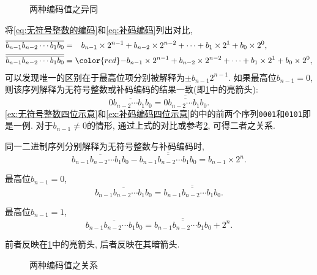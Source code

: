 \documentclass{ctexart}
\def\binaryseq#1{{\texttt{#1}}}
\begin{document}
\begin{figure}[ht]
    \centering
    \caption{两种编码值之异同}
    \label{fig:两种编码值之异同}
\end{figure}
将\eqref{eq:无符号整数的编码}和\eqref{eq:补码编码}列出对比,
\begin{align*}
    {\overline{b_{n-1}b_{n-2}\cdots b_1b_0}} &= \phantom{-}b_{n-1} \times 2^{n-1} + b_{n-2} \times 2^{n-2} + \cdots + b_1 \times 2^1 + b_0 \times 2^0, \\
    \overline{\overline{b_{n-1}b_{n-2}\cdots b_1b_0}} &= {\color{red}-}b_{n-1} \times 2^{n-1} + b_{n-2} \times 2^{n-2} + \cdots + b_1 \times 2^1 + b_0 \times 2^0,
\end{align*}
可以发现唯一的区别在于最高位项分别被解释为$\pm b_{n-1}2^{n-1}$. 如果最高位$b_{n-1} = 0$, 则该序列解释为无符号整数或补码编码的结果一致(即\cref{fig:两种编码值之异同}中的亮箭头):
\[ \overline{0b_{n-2}\cdots b_1b_0} = \overline{\overline{0b_{n-2}\cdots b_1b_0}}. \]
\cref{ex:无符号整数四位示意}和\cref{ex:补码编码四位示意}的中的前两个序列\binaryseq{0001}和\binaryseq{0101}即是一例. 对于$b_{n-1}\neq 0$的情形, 通过上式的对比或参考\cref{fig:两种编码值之关系}, 可得二者之关系.
\begin{finale}
    \begin{theorem}[两种编码值之关系]
        \label{thm:两种编码值之关系}
        同一二进制序列分别解释为无符号整数与补码编码时,
        \[ {\overline{b_{n-1}b_{n-2}\cdots b_1b_0}} - \overline{\overline{b_{n-1}b_{n-2}\cdots b_1b_0}} = b_{n-1} \times 2^{n}. \]
        \begin{cenum}
            \item 最高位$b_{n-1} = 0$, \[ {\overline{b_{n-1}b_{n-2}\cdots b_1b_0}} = \overline{\overline{b_{n-1}b_{n-2}\cdots b_1b_0}}. \]
            \item 最高位$b_{n-1} = 1$, \[ {\overline{b_{n-1}b_{n-2}\cdots b_1b_0}} = \overline{\overline{b_{n-1}b_{n-2}\cdots b_1b_0}} + 2^n. \]
        \end{cenum}
        前者反映在\cref{fig:两种编码值之异同}中的亮箭头, 后者反映在其暗箭头.
    \end{theorem}
\end{finale}
\begin{figure}[ht]
    \centering
    \caption{两种编码值之关系}
    \label{fig:两种编码值之关系}
\end{figure}
\end{document}

